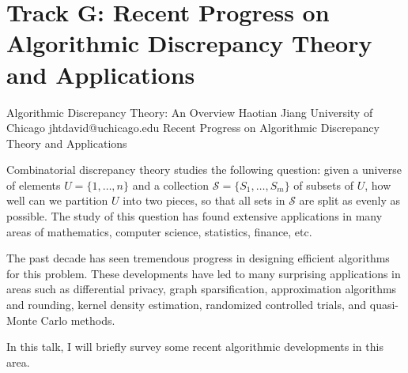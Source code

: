 \section{Track G: Recent Progress on Algorithmic Discrepancy Theory and Applications}\newpage

\begin{talk}
  {Algorithmic Discrepancy Theory: An Overview}%
  {Haotian Jiang}%
  {University of Chicago}%
  {jhtdavid@uchicago.edu}%
  {}
  {Recent Progress on Algorithmic Discrepancy Theory and Applications}
    
   
Combinatorial discrepancy theory studies the following question: given a universe of elements $U=\{1,\ldots, n\}$ and a collection $\mathcal{S} = \{S_1, \ldots, S_m\}$ of subsets of $U$, how well can we partition $U$ into two pieces, so that all sets in $\mathcal{S}$ are split as evenly as possible.
The study of this question has found extensive applications in many areas of mathematics, computer science, statistics, finance, etc. 

The past decade has seen tremendous progress in designing efficient algorithms for this problem. These developments have led to many surprising applications in areas such as differential privacy, graph sparsification, approximation algorithms and rounding, kernel density estimation, randomized controlled trials, and quasi-Monte Carlo methods.

In this talk, I will briefly survey some recent algorithmic developments in this area. 



\end{talk}

